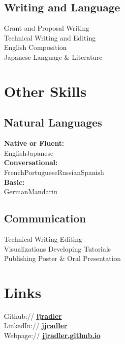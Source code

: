 \documentclass[letterpaper]{radler-resume-class}
\begin{document}
\begin{minipage}[t]{0.32\textwidth}
\sectionspace

\subsection{Writing and Language}
\textbullet{}Grant and Proposal Writing\\
\textbullet{}Technical Writing and Editing\\
\textbullet{}English Composition\\
\textbullet{}Japanese Language \& Literature

\sectionspace


\section{Other Skills}

\sectionspace

\subsection{Natural Languages}
\textbf{Native or Fluent:}\\English\textbullet{}Japanese\\
\textbf{Conversational:} \\French\textbullet{}Portuguese\textbullet{}Russian\textbullet{}Spanish\\
\textbf{Basic:}\\German\textbullet{}Mandarin

\sectionspace

\subsection{Communication}
Technical Writing \textbullet{} Editing\\
Visualizations \textbullet{} Developing Tutorials\\
Publishing \textbullet{} Poster \& Oral Presentation

\sectionspace

\section{Links} 
\sectionspace
Github:// \href{https://github.com/jjradler}{\bf jjradler} \\
LinkedIn:// \href{https://www.linkedin.com/in/jjradler/}{\bf jjradler} \\
Webpage:// \href{http://jjradler.github.io}{\bf jjradler.github.io}

\end{minipage} %
\end{document}
